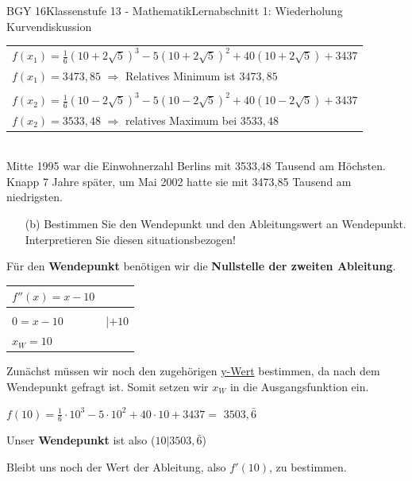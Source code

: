 \documentclass[oneside,openany,headings=optiontotoc,11pt,numbers=noenddot]{scrreprt}
\begin{document}
\begin{worksheet}{BGY 16}{Klassenstufe 13 - Mathematik}{Lernabschnitt 1: Wiederholung Kurvendiskussion}
\begin{framed}
			\begin{tabularx}{\textwidth}{X}
				\(f(x_1) = \frac{1}{6}(10+2\sqrt{5})^3 - 5(10+2\sqrt{5})^2 +40(10+2\sqrt{5}) +3437\)\\
				\(f(x_1) = 3473,85\) \(\Rightarrow\) Relatives Minimum ist \colorbox{green!10}{\(3473,85\)}\\
				\hline
				\\
				\(f(x_2) = \frac{1}{6}(10-2\sqrt{5})^3 - 5(10-2\sqrt{5})^2 +40(10-2\sqrt{5}) +3437\)\\
				\(f(x_2) = 3533,48\) \(\Rightarrow\) relatives Maximum bei \colorbox{green!10}{\(3533,48\)}
			\end{tabularx}
		\\
		Mitte 1995 war die Einwohnerzahl Berlins mit \colorbox{green!10}{3533,48 Tausend} am Höchsten. Knapp 7 Jahre später, um Mai 2002 hatte sie mit \colorbox{green!10}{3473,85 Tausend} am niedrigsten.
		\end{framed}
		\newpage
		\begin{itemize}
			\item[(b)] Bestimmen Sie den Wendepunkt und den Ableitungswert an Wendepunkt.\\
			Interpretieren Sie diesen situationsbezogen!
		\end{itemize}
		\begin{framed}
			\noindent
			Für den \textbf{Wendepunkt} benötigen wir die \textbf{Nullstelle der zweiten Ableitung}.\\
			\begin{tabularx}{\textwidth}{ll}
				\(f''(x) = x-10\)\\
				\hline
				\\
				\(0 = x-10 \) & |\(+10\)\\
				\colorbox{green!10}{\(x_W = 10\)}\\
			\end{tabularx}
			Zunächst müssen wir noch den zugehörigen \underline{y-Wert} bestimmen, da nach dem Wendepunkt gefragt ist. Somit setzen wir \(x_W\) in die Ausgangsfunktion ein.\\
			\par\noindent
			\(f(10) = \frac{1}{6}\cdot{}10^3 - 5\cdot{}10^2 +40\cdot{}10 +3437 =\) \colorbox{green!10}{\(3503,\bar{6}\)}\\
			\par\noindent
			Unser \textbf{Wendepunkt} ist also \colorbox{green!10}{(\(10|3503,\bar{6}\))}\\
			\par\noindent
			Bleibt uns noch der Wert der Ableitung, also \(f'(10)\), zu bestimmen.\\

\end{framed}
\end{worksheet}
\end{document}
